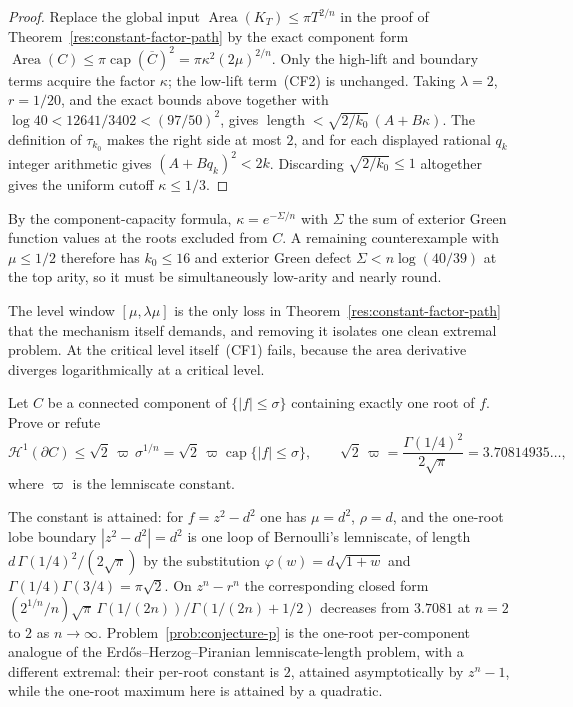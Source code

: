 \begin{proof}
Replace the global input $\operatorname{Area}(K_T)\le\pi T^{2/n}$ in the proof
of Theorem~\ref{res:constant-factor-path} by the exact component form
$\operatorname{Area}(C)\le\pi\operatorname{cap}(\overline C)^2
 =\pi\kappa^2(2\mu)^{2/n}$.  Only the high-lift and boundary terms acquire the
factor $\kappa$; the low-lift term~(CF2) is unchanged.  Taking $\lambda=2$,
$r=1/20$, and the exact bounds above together with
$\log40<12641/3402<(97/50)^2$, gives
$\operatorname{length}<\sqrt{2/k_0}\,(A+B\kappa)$.  The definition of
$\tau_{k_0}$ makes the right side at most $2$, and for each displayed rational
$q_k$ integer arithmetic gives $(A+Bq_k)^2<2k$.  Discarding
$\sqrt{2/k_0}\le1$ altogether gives the uniform cutoff $\kappa\le1/3$.
\end{proof}

By the component-capacity formula, $\kappa=e^{-\Sigma/n}$ with $\Sigma$ the sum
of exterior Green function values at the roots excluded from $C$.  A remaining
counterexample with $\mu\le1/2$ therefore has $k_0\le16$ and exterior Green
defect $\Sigma<n\log(40/39)$ at the top arity, so it must be simultaneously
low-arity and nearly round.

The level window $[\mu,\lambda\mu]$ is the only loss in
Theorem~\ref{res:constant-factor-path} that the mechanism itself demands, and
removing it isolates one clean extremal problem.  At the critical level
itself~(CF1) fails, because the area derivative diverges logarithmically at a
critical level.

\begin{problem}\label{prob:conjecture-p}
Let $C$ be a connected component of $\{|f|\le\sigma\}$ containing exactly one
root of $f$.  Prove or refute
\[
 \mathcal H^1(\partial C)\le\sqrt2\,\varpi\,\sigma^{1/n}
 =\sqrt2\,\varpi\operatorname{cap}\{|f|\le\sigma\},
 \qquad
 \sqrt2\,\varpi=\frac{\Gamma(1/4)^2}{2\sqrt\pi}=3.70814935\ldots,
\]
where $\varpi$ is the lemniscate constant.
\end{problem}

The constant is attained: for $f=z^2-d^2$ one has $\mu=d^2$, $\rho=d$, and the
one-root lobe boundary $|z^2-d^2|=d^2$ is one loop of Bernoulli's lemniscate,
of length $d\,\Gamma(1/4)^2/(2\sqrt\pi)$ by the substitution
$\varphi(w)=d\sqrt{1+w}$ and $\Gamma(1/4)\Gamma(3/4)=\pi\sqrt2$.  On
$z^n-r^n$ the corresponding closed form
$(2^{1/n}/n)\sqrt\pi\,\Gamma(1/(2n))/\Gamma(1/(2n)+1/2)$ decreases from
$3.7081$ at $n=2$ to $2$ as $n\to\infty$.  Problem~\ref{prob:conjecture-p} is
the one-root per-component analogue of the Erd\H{o}s--Herzog--Piranian
lemniscate-length problem, with a different extremal: their per-root constant
is $2$, attained asymptotically by $z^n-1$, while the one-root maximum here is
attained by a quadratic.

